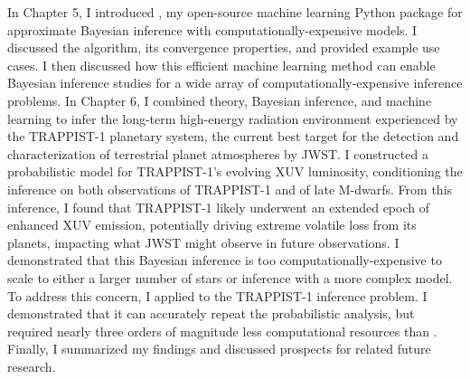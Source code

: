 In Chapter 5, I introduced \approxposterior, my open-source machine learning Python package for approximate Bayesian inference with computationally-expensive models. I discussed the algorithm, its convergence properties, and provided example use cases. I then discussed how this efficient machine learning method can enable Bayesian inference studies for a wide array of computationally-expensive inference problems. In Chapter 6, I combined theory, Bayesian inference, and machine learning to infer the long-term high-energy radiation environment experienced by the TRAPPIST-1 planetary system, the current best target for the detection and characterization of terrestrial planet atmospheres by JWST. I constructed a probabilistic model for TRAPPIST-1's evolving XUV luminosity, conditioning the inference on both observations of TRAPPIST-1 and of late M-dwarfs. From this inference, I found that TRAPPIST-1 likely underwent an extended epoch of enhanced XUV emission, potentially driving extreme volatile loss from its planets, impacting what JWST might observe in future observations. I demonstrated that this Bayesian inference is too computationally-expensive to scale to either a larger number of stars or inference with a more complex model. To address this concern, I applied \approxposterior to the TRAPPIST-1 inference problem. I demonstrated that it can accurately repeat the probabilistic analysis, but required nearly three orders of magnitude less computational resources than \emcee.  Finally, I summarized my findings and discussed prospects for related future research.

